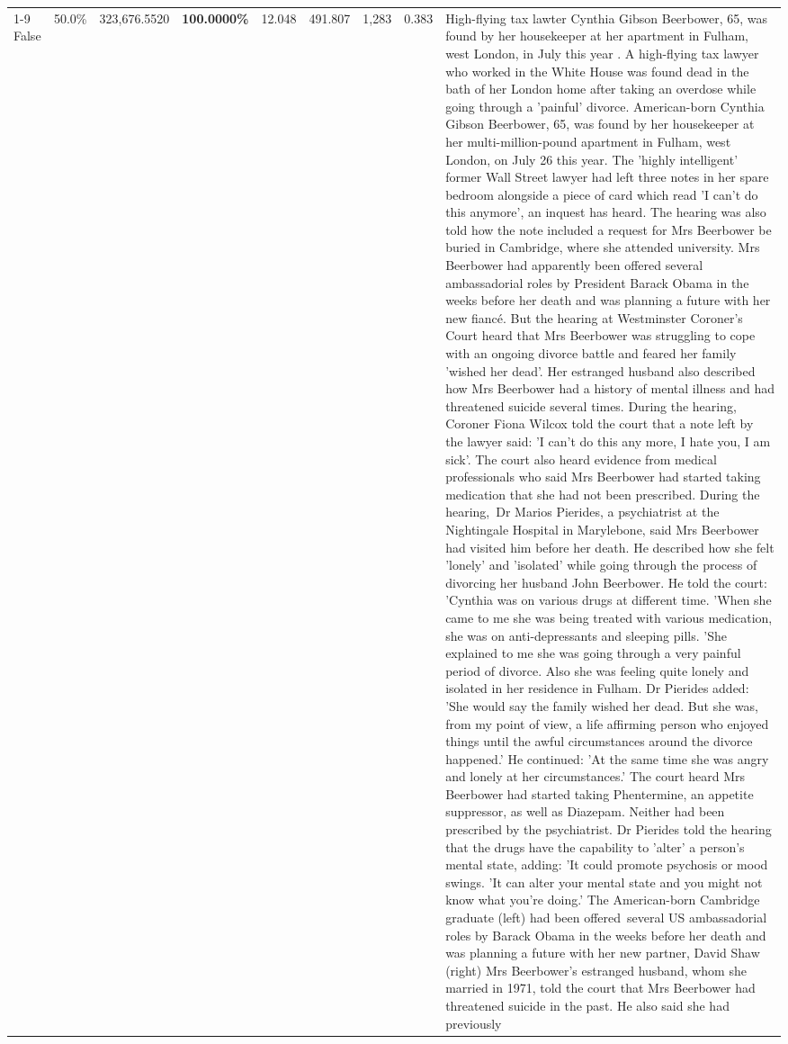 \begin{table}[H]
\begin{tabular}{lllrlllll}
\cline{1-9}
False & 50.0\% & 323,676.5520 & \bfseries \color{red} 100.0000\% & 12.048 & 491.807 & 1,283 & 0.383 & High-flying tax lawter Cynthia Gibson Beerbower, 65, was found by her housekeeper at her apartment in Fulham, west London, in July this year . A high-flying tax lawyer who worked in the White House was found dead in the bath of her London home after taking an overdose while going through a 'painful' divorce. American-born Cynthia Gibson Beerbower, 65, was found by her housekeeper at her multi-million-pound apartment in Fulham, west London, on July 26 this year. The 'highly intelligent' former Wall Street lawyer had left three notes in her spare bedroom alongside a piece of card which read 'I can't do this anymore', an inquest has heard. The hearing was also told how the note included a request for Mrs Beerbower be buried in Cambridge, where she attended university. Mrs Beerbower had apparently been offered several ambassadorial roles by President Barack Obama in the weeks before her death and was planning a future with her new fiancé. But the hearing at Westminster Coroner's Court heard that Mrs Beerbower was struggling to cope with an ongoing divorce battle and feared her family 'wished her dead'. Her estranged husband also described how Mrs Beerbower had a history of mental illness and had threatened suicide several times. During the hearing, Coroner Fiona Wilcox told the court that a note left by the lawyer said: 'I can't do this any more, I hate you, I am sick'. The court also heard evidence from medical professionals who said Mrs Beerbower had started taking medication that she had not been prescribed. During the hearing, Dr Marios Pierides, a psychiatrist at the Nightingale Hospital in Marylebone, said Mrs Beerbower had visited him before her death. He described how she felt 'lonely' and 'isolated' while going through the process of divorcing her husband John Beerbower. He told the court: 'Cynthia was on various drugs at different time. 'When she came to me she was being treated with various medication, she was on anti-depressants and sleeping pills. 'She explained to me she was going through a very painful period of divorce. Also she was feeling quite lonely and isolated in her residence in Fulham. Dr Pierides added: 'She would say the family wished her dead. But she was, from my point of view, a life affirming person who enjoyed things until the awful circumstances around the divorce happened.' He continued: 'At the same time she was angry and lonely at her circumstances.' The court heard Mrs Beerbower had started taking Phentermine, an appetite suppressor, as well as Diazepam. Neither had been prescribed by the psychiatrist. Dr Pierides told the hearing that the drugs have the capability to 'alter' a person's mental state, adding: 'It could promote psychosis or mood swings. 'It can alter your mental state and you might not know what you're doing.' The American-born Cambridge graduate (left) had been offered several US ambassadorial roles by Barack Obama in the weeks before her death and was planning a future with her new partner, David Shaw (right) Mrs Beerbower's estranged husband, whom she married in 1971, told the court that Mrs Beerbower had threatened suicide in the past. He also said she had previously 
\end{tabular}
\end{table}
